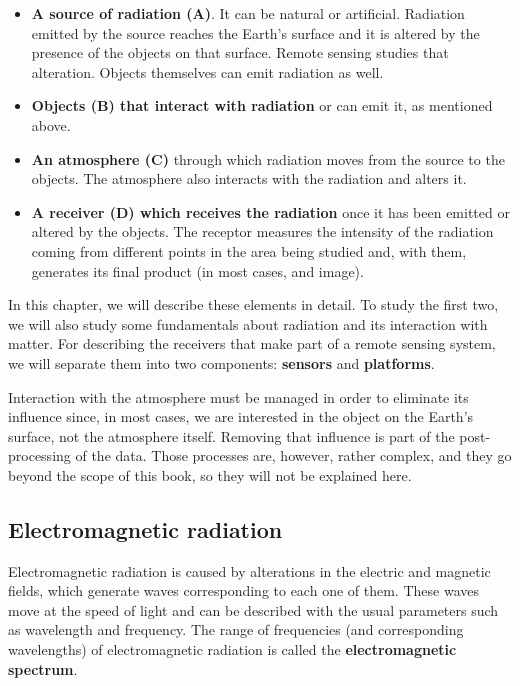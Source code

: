 \begin{itemize}
	\item \textbf{A source of radiation (A)}. It can be natural or artificial. Radiation emitted by the source reaches the Earth's surface and it is altered by the presence of the objects on that surface. Remote sensing studies that alteration. Objects themselves can emit radiation as well.
	\item \textbf{Objects (B) that interact with radiation} or can emit it, as mentioned above.
	\item \textbf{An atmosphere (C)} through which radiation moves from the source to the objects. The atmosphere also interacts with the radiation and alters it.
	\item \textbf{A receiver (D) which receives the radiation} once it has been emitted or altered by the objects. The receptor measures the intensity of the radiation coming from different points in the area being studied and, with them, generates its final product (in most cases, and image). 
\end{itemize}

In this chapter, we will describe these elements in detail. To study the first two, we will also study some fundamentals about radiation and its interaction with matter. For describing the receivers that make part of a remote sensing system, we will separate them into two components: \textbf{sensors} and \textbf{platforms}.

Interaction with the atmosphere must be managed in order to eliminate its influence since, in most cases, we are interested in the object on the Earth's surface, not the atmosphere itself. Removing that influence is part of the post-processing of the data. Those processes are, however, rather complex, and they go beyond the scope of this book, so they will not be explained here.


\subsection{Electromagnetic radiation}

Electromagnetic radiation is caused by alterations in the electric and magnetic fields, which generate waves corresponding to each one of them. These waves move at the speed of light and can be described with the usual parameters such as wavelength and frequency. The range of frequencies (and corresponding wavelengths) of electromagnetic radiation is called the \textbf{electromagnetic spectrum}.

